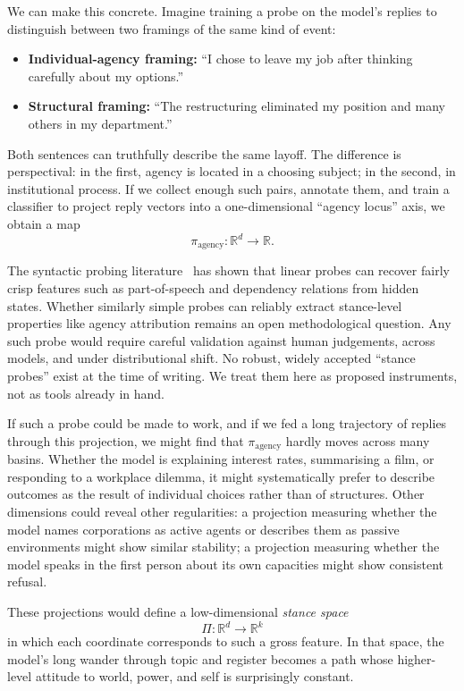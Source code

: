 \documentclass[12pt,a4paper]{article}
\begin{document}
We can make this concrete. Imagine training a probe on the model's replies to distinguish between two framings of the same kind of event:

\begin{itemize}
  \item \textbf{Individual-agency framing:} ``I chose to leave my job after thinking carefully about my options.''
  \item \textbf{Structural framing:} ``The restructuring eliminated my position and many others in my department.''
\end{itemize}

Both sentences can truthfully describe the same layoff. The difference is perspectival: in the first, agency is located in a choosing subject; in the second, in institutional process. If we collect enough such pairs, annotate them, and train a classifier to project reply vectors into a one-dimensional ``agency locus'' axis, we obtain a map
\[
\pi_{\text{agency}} : \mathbb{R}^d \to \mathbb{R}.
\]

The syntactic probing literature~\cite{belinkov_glass, hewitt_manning} has shown that linear probes can recover fairly crisp features such as part-of-speech and dependency relations from hidden states. Whether similarly simple probes can reliably extract stance-level properties like agency attribution remains an open methodological question. Any such probe would require careful validation against human judgements, across models, and under distributional shift. No robust, widely accepted ``stance probes'' exist at the time of writing. We treat them here as proposed instruments, not as tools already in hand.

If such a probe could be made to work, and if we fed a long trajectory of replies through this projection, we might find that $\pi_{\text{agency}}$ hardly moves across many basins. Whether the model is explaining interest rates, summarising a film, or responding to a workplace dilemma, it might systematically prefer to describe outcomes as the result of individual choices rather than of structures. Other dimensions could reveal other regularities: a projection measuring whether the model names corporations as active agents or describes them as passive environments might show similar stability; a projection measuring whether the model speaks in the first person about its own capacities might show consistent refusal.

These projections would define a low-dimensional \emph{stance space}
\[
\Pi : \mathbb{R}^d \to \mathbb{R}^k
\]
in which each coordinate corresponds to such a gross feature. In that space, the model's long wander through topic and register becomes a path whose higher-level attitude to world, power, and self is surprisingly constant.
\end{document}
